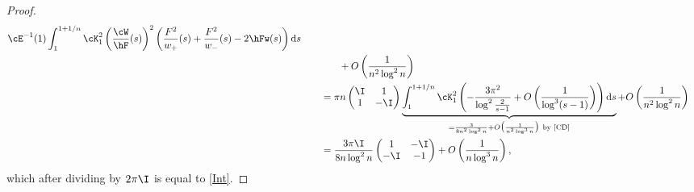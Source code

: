 \begin{proof}
\begin{align}
 \cE^{-1}(1)
 \int_1^{1+1/n} \cK^2_1\left(\frac{\cW}{\hF}(s)\right)^2\left(\frac{F^2}{w_+}(s)+\frac{F^2}{w_-}(s)-2\hFw(s)\right) {\rm d}s\nonumber
 \\
 &\phantom{\qquad=\times}{}+ O\left(\frac{1}{n^2\log^2 n}\right)\nonumber
 \\
 &\qquad= \pi n \begin{pmatrix}
 \I & 1
 \\
 1 & -\I
 \end{pmatrix}
 \underbrace{\int_1^{1+1/n} \cK^2_1 \left(-\frac{3\pi^2}{\log^2 \frac{2}{s-1}} + O\left(\frac{1}{\log^3(s-1)}\right)\right) {\rm d}s }_{= \frac{3}{8 n^2\log^2 n} + O\big(\frac{1}{n^2\log^3 n}\big) \ \text{by \cite[Proposition~C.1]{CD}}}
 + O\left(\frac{1}{n^2\log^2 n}\right)\nonumber
 \\
 &\qquad= \frac{3\pi\I}{8n \log^2n} \begin{pmatrix}
1 & -\I\\
-\I & -1
\end{pmatrix}+ O\left(\frac{1}{n\log^3 n}\right),\label{firstFormula}
\end{align}
which after dividing by $2\pi \I$ is equal to \eqref{Int}.


\end{proof}

